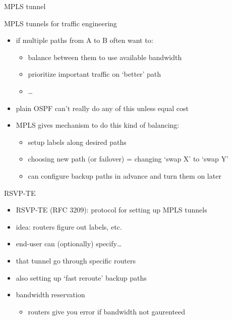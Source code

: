 \begin{frame}[fragile]{MPLS tunnel}
\end{frame}


\begin{frame}{MPLS tunnels for traffic engineering}
    \begin{itemize}
    \item if multiple paths from A to B often want to:
        \begin{itemize}
        \item balance between them to use available bandwidth
        \item prioritize important traffic on `better' path
        \item \ldots
        \end{itemize}
    \item plain OSPF can't really do any of this unless equal cost
    \vspace{.5cm}
    \item MPLS gives mechanism to do this kind of balancing:
        \begin{itemize}
        \item setup labels along desired paths
        \item choosing new path (or failover) = changing `swap X' to `swap Y'
        \item can configure backup paths in advance and turn them on later
        \end{itemize}
    \end{itemize}
\end{frame}

\begin{frame}{RSVP-TE}
    \begin{itemize}
    \item RSVP-TE (RFC 3209): protocol for setting up MPLS tunnels
    \item idea: routers figure out labels, etc.
    \item end-user can (optionally) specify\ldots
    \vspace{.5cm}
    \item that tunnel go through specific routers
    \item also setting up `fast reroute' backup paths
    \item bandwidth reservation 
        \begin{itemize}
        \item routers give you error if bandwidth not gaurenteed
        \end{itemize}
    \end{itemize}
\end{frame}

